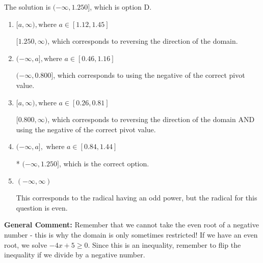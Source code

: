 \documentclass{extbook}[14pt]
\begin{document}
\begin{enumerate}
{The solution is \( (-\infty, 1.250] \), which is option D.\begin{enumerate}[label=\Alph*.]
\item \( [a, \infty), \text{where } a \in [1.12, 1.45] \)

 $[1.250, \infty)$, which corresponds to reversing the direction of the domain.
\item \( (-\infty, a], \text{where } a \in [0.46, 1.16] \)

$(-\infty, 0.800]$, which corresponds to using the negative of the correct pivot value.
\item \( [a, \infty), \text{where } a \in [0.26, 0.81] \)

$[0.800, \infty)$, which corresponds to reversing the direction of the domain AND using the negative of the correct pivot value.
\item \( (-\infty, a], \text{ where } a \in [0.84, 1.44] \)

* $(-\infty, 1.250]$, which is the correct option.
\item \( (-\infty, \infty) \)

This corresponds to the radical having an odd power, but the radical for this question is even.
\end{enumerate}

\textbf{General Comment:} Remember that we cannot take the even root of a negative number - this is why the domain is only sometimes restricted! If we have an even root, we solve $-4 x + 5 \geq 0$. Since this is an inequality, remember to flip the inequality if we divide by a negative number.
}
\end{enumerate}
\end{document}
